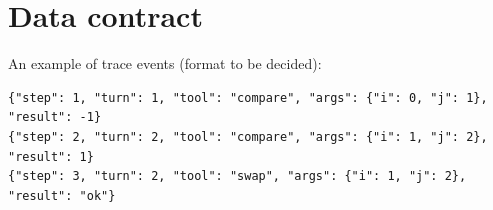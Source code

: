 \section{Data contract}
\label{app:data-contract}


An example of trace events (format to be decided):

\begin{lstlisting}
{"step": 1, "turn": 1, "tool": "compare", "args": {"i": 0, "j": 1}, "result": -1}
{"step": 2, "turn": 2, "tool": "compare", "args": {"i": 1, "j": 2}, "result": 1}
{"step": 3, "turn": 2, "tool": "swap", "args": {"i": 1, "j": 2}, "result": "ok"}
\end{lstlisting}
